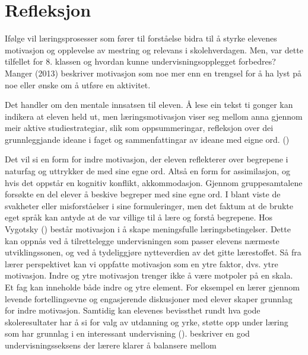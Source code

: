 \documentclass[main.tex]{subfiles}
\begin{document}
\section*{Refleksjon}
\label{sec:3}

Ifølge  vil læringsprosesser som fører til forståelse bidra til å styrke elevenes 
motivasjon og opplevelse av mestring og relevans i skolehverdagen. Men, var dette tilfellet for 8. 
klassen og hvordan kunne undervisningsopplegget forbedres?
\newline
\newline
Manger (2013) beskriver motivasjon som noe mer enn en trengsel for å ha lyst på noe eller ønske om å 
utføre en aktivitet.
\begin{displayquote}
Det handler om den mentale innsatsen til eleven. Å lese ein tekst ti gonger kan indikera at eleven 
held ut, men læringsmotivasjon viser seg mellom anna gjennom meir aktive studiestrategiar, slik som 
oppsummeringar, refleksjon over dei grunnleggjande ideane i faget og sammenfattingar av ideane med 
eigne ord. ()
\end{displayquote}
Det vil si en form for indre motivasjon, der eleven reflekterer over begrepene i naturfag og uttrykker
de med sine egne ord. Altså en form for assimilasjon, og hvis det oppstår en kognitiv konflikt, 
akkommodasjon. Gjennom gruppesamtalene forsøkte en del elever å beskive begreper med sine egne ord. 
I blant viste de svakheter eller misforståelser i sine formuleringer, men det faktum at de brukte eget 
språk kan antyde at de var villige til å lære og forstå begrepene. Hos Vygotsky 
() består motivasjon i å skape meningsfulle læringsbetingelser. Dette kan oppnås 
ved å tilrettelegge undervisningen som passer elevens nærmeste utviklingssonen, og ved å tydeliggjøre 
nytteverdien av det gitte lærestoffet. Så fra lærer perspektivet kan vi oppfatte motivasjon som en 
ytre faktor, dvs. ytre motivasjon. Indre og ytre motivasjon trenger ikke å være motpoler på en skala. 
Et fag kan inneholde både indre og ytre element. For eksempel en lærer gjennom levende fortellingsevne 
og engasjerende diskusjoner med elever skaper grunnlag for indre motivasjon. Samtidig kan elevenes 
bevissthet rundt hva gode skoleresultater har å si for valg av utdanning og yrke, støtte opp under 
læring som har grunnlag i en interessant undervisning ().
\newline
\newline
{} beskriver en god undervisningsseksens der lærere klarer å balansere mellom 
\end{document}
